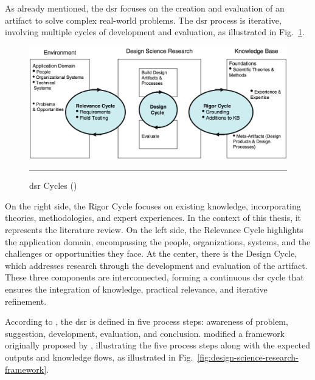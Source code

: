 As already mentioned, the \gls{dsr} focuses on the creation and evaluation of an artifact to solve complex real-world problems.
The \gls{dsr} process is iterative, involving multiple cycles of development and evaluation, as illustrated in Fig.~\ref{fig:design-science-research-cycles}.

\begin{figure}[htbp]
    \centering
 \includegraphics[width=.9\textwidth]{figures/research-design/design-science-research-cycles.png}
     \rule{35em}{0.5pt}
    \caption{\acrlong{dsr} Cycles (\textcite{Hevner2010}) } 
 \label{fig:design-science-research-cycles}
\end{figure}

On the right side, the Rigor Cycle focuses on existing knowledge, incorporating theories, methodologies, and expert experiences.
In the context of this thesis, it represents the literature review.
On the left side, the Relevance Cycle highlights the application domain, encompassing the people, organizations, systems, and the challenges or opportunities they face.
At the center, there is the Design Cycle, which addresses research through the development and evaluation of the artifact.
These three components are interconnected, forming a continuous \gls{dsr} cycle that ensures the integration of knowledge, practical relevance, and iterative refinement.

According to \textcite{Hevner2010}, the \gls{dsr} is defined in five process steps: awareness of problem, suggestion, development, evaluation, and conclusion.
\textcite{Hevner2010} modified a framework originally proposed by \textcite{Vaishnavi2007}, illustrating the five process steps along with the expected outputs and knowledge flows, as illustrated in Fig.~\ref{fig:design-science-research-framework}.

